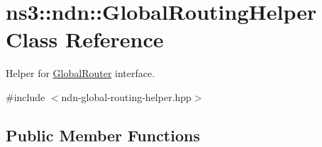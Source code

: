 \hypertarget{classns3_1_1ndn_1_1GlobalRoutingHelper}{}\section{ns3\+:\+:ndn\+:\+:Global\+Routing\+Helper Class Reference}
\label{classns3_1_1ndn_1_1GlobalRoutingHelper}


Helper for \hyperlink{classns3_1_1ndn_1_1GlobalRouter}{Global\+Router} interface.  




{\ttfamily \#include $<$ndn-\/global-\/routing-\/helper.\+hpp$>$}

\subsection*{Public Member Functions}
